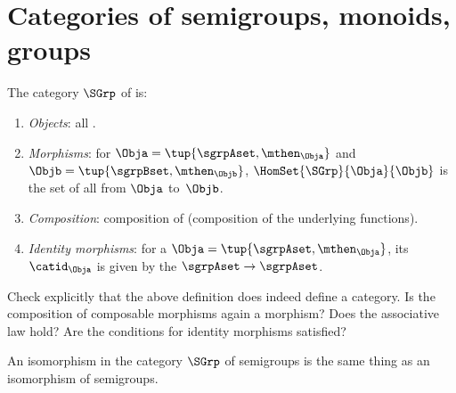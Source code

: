 
\section[Categories of semigroups, monoids, groups]{Categories of semigroups, monoids, groups}
\label{sec:cats-of-semigroups-monoids-groups}


\begin{ctdefinition}
    \label{def:SGrp}
    The category $\SGrp$ of  is:
    \begin{enumerate}
        \item \emph{Objects}: all .
        \item \emph{Morphisms}: for  $\Obja = \tup{\sgrpAset, \mthen_\Obja}$ and $\Objb = \tup{\sgrpBset, \mthen_\Objb}$,  $\HomSet{\SGrp}{\Obja}{\Objb}$ is the set of all  from $\Obja$ to~$\Objb$.
        \item \emph{Composition}: composition of  (composition of the underlying functions).
        \item \emph{Identity morphisms}: for a  $\Obja = \tup{\sgrpAset, \mthen_\Obja}$, its  $\catid_\Obja$ is given by the  $\sgrpAset \to \sgrpAset$.
    \end{enumerate}
\end{ctdefinition}

\begin{gradedexercise}
    Check explicitly that the above definition does indeed define a category.
    Is the composition of composable morphisms again a morphism? Does the associative law hold? Are the conditions for identity morphisms satisfied?
\end{gradedexercise}

\begin{remark}
    An isomorphism in the category $\SGrp$ of semigroups is the same thing as an isomorphism of semigroups.
\end{remark}


